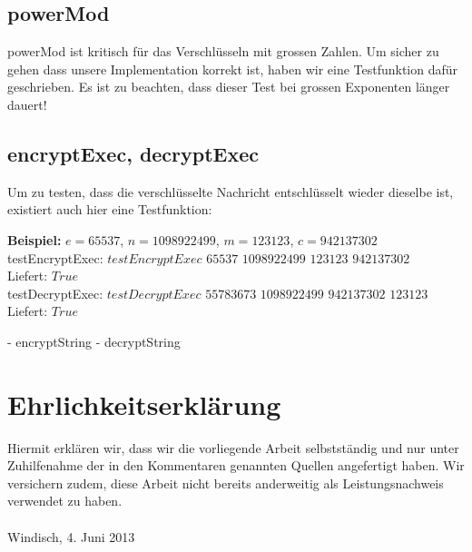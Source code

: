 \documentclass[a4paper, 11pt]{article} %
\begin{document}
\subsection{powerMod}
powerMod ist kritisch für das Verschlüsseln mit grossen Zahlen. Um sicher zu gehen dass unsere Implementation korrekt ist, haben wir eine Testfunktion dafür geschrieben. Es ist zu beachten, dass dieser Test bei grossen Exponenten länger dauert!


\subsection{encryptExec, decryptExec}
Um zu testen, dass die verschlüsselte Nachricht entschlüsselt wieder dieselbe ist, existiert auch hier eine Testfunktion:

\textbf{Beispiel:} $e=65537$, $n=1098922499$, $m=123123$, $c=942137302$\\
testEncryptExec: $testEncryptExec$ $65537$ $1098922499$ $123123$ $942137302$\\
Liefert: $True$\\
testDecryptExec: $testDecryptExec$ $55783673$ $1098922499$ $942137302$ $123123$\\
Liefert: $True$

- encryptString
- decryptString

\section{Ehrlichkeitserklärung}
Hiermit erklären wir, dass wir die vorliegende Arbeit selbstständig und nur unter Zuhilfenahme der in den Kommentaren genannten Quellen angefertigt haben. Wir versichern zudem, diese Arbeit nicht bereits anderweitig als Leistungsnachweis verwendet zu haben.\\\\
Windisch, 4. Juni 2013
\end{document}
